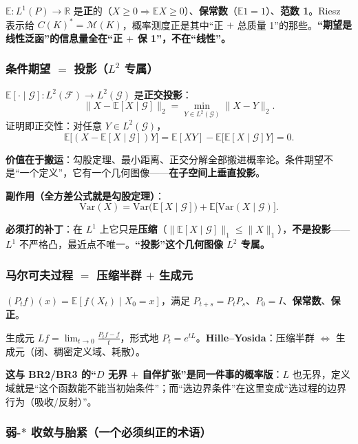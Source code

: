 $\mathbb{E}:L^1(P)\to\mathbb{R}$ 是\textbf{正}的（$X\ge0\Rightarrow\mathbb{E}X\ge0$）、\textbf{保常数}（$\mathbb{E}1=1$）、\textbf{范数 1}。Riesz 表示给 $C(K)^*=\mathcal{M}(K)$，概率测度正是其中“正 $+$ 总质量 1”的那些。\textbf{“期望是线性泛函”的信息量全在“正 $+$ 保 1”，不在“线性”。}

\subsubsection{条件期望 $=$ 投影（$L^2$ 专属）}

$\mathbb{E}[\cdot\mid\mathcal{G}]:L^2(\mathcal{F})\to L^2(\mathcal{G})$ 是\textbf{正交投影}：
\[
\lVert X-\mathbb{E}[X\mid\mathcal{G}]\rVert_2=\min_{Y\in L^2(\mathcal{G})}\lVert X-Y\rVert_2 .
\]
证明即正交性：对任意 $Y\in L^2(\mathcal{G})$，
\[
\mathbb{E}\big[(X-\mathbb{E}[X\mid\mathcal{G}])Y\big]
=\mathbb{E}[XY]-\mathbb{E}\big[\mathbb{E}[X\mid\mathcal{G}]Y\big]=0 .
\]

\textbf{价值在于搬运}：勾股定理、最小距离、正交分解全部搬进概率论。条件期望不是“一个定义”，它有一个几何图像——\textbf{在子空间上垂直投影}。

\textbf{副作用（全方差公式就是勾股定理）}：
\[
\mathrm{Var}(X)=\mathrm{Var}\big(\mathbb{E}[X\mid\mathcal{G}]\big)+\mathbb{E}\big[\mathrm{Var}(X\mid\mathcal{G})\big].
\]

\textbf{必须打的补丁}：在 $L^1$ 上它只是\textbf{压缩}（$\lVert\mathbb{E}[X\mid\mathcal{G}]\rVert_1\le\lVert X\rVert_1$），\textbf{不是投影}——$L^1$ 不严格凸，最近点不唯一。\textbf{“投影”这个几何图像 $L^2$ 专属。}

\subsubsection{马尔可夫过程 $=$ 压缩半群 $+$ 生成元}

$(P_tf)(x)=\mathbb{E}[f(X_t)\mid X_0=x]$，满足 $P_{t+s}=P_tP_s$、$P_0=I$、\textbf{保常数}、\textbf{保正}。

生成元 $Lf=\lim_{t\to0}\frac{P_tf-f}{t}$，形式地 $P_t=e^{tL}$。\textbf{Hille--Yosida}：压缩半群 $\iff$ 生成元（闭、稠密定义域、耗散）。

\textbf{这与 BR2/BR3 的“$D$ 无界 $+$ 自伴扩张”是同一件事的概率版}：$L$ 也无界，定义域就是“这个函数能不能当初始条件”；而“选边界条件”在这里变成“选过程的边界行为（吸收/反射）”。

\subsubsection{弱-$*$ 收敛与胎紧（一个必须纠正的术语）}

